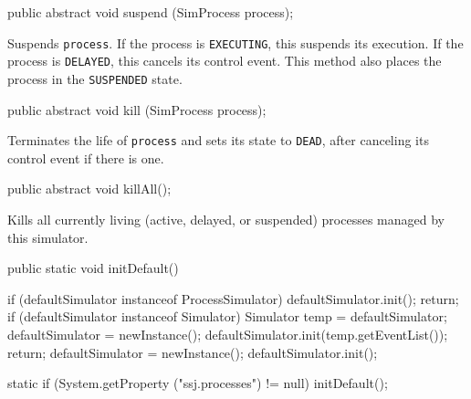 \begin{htmlonly}
\end{htmlonly}
\begin{code}

   public abstract void suspend (SimProcess process);
\end{code}
\begin{tabb} Suspends \texttt{process}.
   If the process is \texttt{EXECUTING}, this suspends its execution.
   If the process is \texttt{DELAYED}, this cancels its control event.
   This method also places the process in the \texttt{SUSPENDED} state.
\end{tabb}
\begin{htmlonly}
\end{htmlonly}
\begin{code}

   public abstract void kill (SimProcess process);
\end{code}
  \begin{tabb}  Terminates the life of \texttt{process} and sets its state to
   \texttt{DEAD}, after canceling its control event if there is one.
  \end{tabb}
\begin{code}

   public abstract void killAll();
\end{code}
\begin{tabb}  Kills all currently living (active, delayed, or suspended) processes managed by
  this simulator.
\end{tabb}
\begin{code}

   public static void initDefault() \begin{hide} {
      if (defaultSimulator instanceof ProcessSimulator) {
         defaultSimulator.init();
         return;
      }
      if (defaultSimulator instanceof Simulator) {
         Simulator temp = defaultSimulator;
         defaultSimulator = newInstance();
         defaultSimulator.init(temp.getEventList());
         return;
      }
      defaultSimulator = newInstance();
      defaultSimulator.init();
   }

   static {
      if (System.getProperty ("ssj.processes") != null)
         initDefault();
   } \end{hide}
\end{code}
